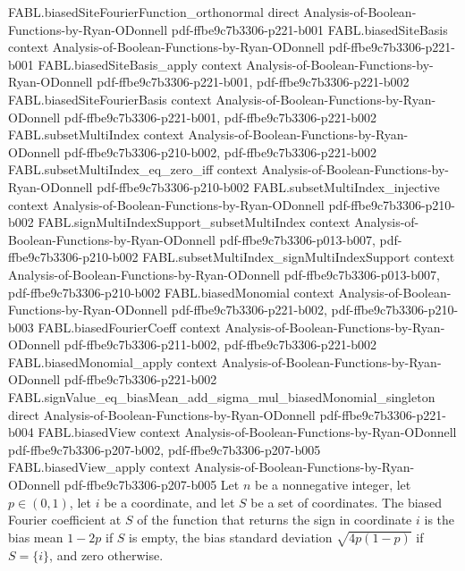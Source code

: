 \begin{theorem}
  {FABL.biasedSiteFourierFunction_orthonormal}
  {direct}
  {Analysis-of-Boolean-Functions-by-Ryan-ODonnell}
  {pdf-ffbe9c7b3306-p221-b001}
\proofstep
  {FABL.biasedSiteBasis}
  {context}
  {Analysis-of-Boolean-Functions-by-Ryan-ODonnell}
  {pdf-ffbe9c7b3306-p221-b001}
\proofstep
  {FABL.biasedSiteBasis_apply}
  {context}
  {Analysis-of-Boolean-Functions-by-Ryan-ODonnell}
  {pdf-ffbe9c7b3306-p221-b001,
    pdf-ffbe9c7b3306-p221-b002}
\proofstep
  {FABL.biasedSiteFourierBasis}
  {context}
  {Analysis-of-Boolean-Functions-by-Ryan-ODonnell}
  {pdf-ffbe9c7b3306-p221-b001,
    pdf-ffbe9c7b3306-p221-b002}
\proofstep
  {FABL.subsetMultiIndex}
  {context}
  {Analysis-of-Boolean-Functions-by-Ryan-ODonnell}
  {pdf-ffbe9c7b3306-p210-b002,
    pdf-ffbe9c7b3306-p221-b002}
\proofstep
  {FABL.subsetMultiIndex_eq_zero_iff}
  {context}
  {Analysis-of-Boolean-Functions-by-Ryan-ODonnell}
  {pdf-ffbe9c7b3306-p210-b002}
\proofstep
  {FABL.subsetMultiIndex_injective}
  {context}
  {Analysis-of-Boolean-Functions-by-Ryan-ODonnell}
  {pdf-ffbe9c7b3306-p210-b002}
\proofstep
  {FABL.signMultiIndexSupport_subsetMultiIndex}
  {context}
  {Analysis-of-Boolean-Functions-by-Ryan-ODonnell}
  {pdf-ffbe9c7b3306-p013-b007,
    pdf-ffbe9c7b3306-p210-b002}
\proofstep
  {FABL.subsetMultiIndex_signMultiIndexSupport}
  {context}
  {Analysis-of-Boolean-Functions-by-Ryan-ODonnell}
  {pdf-ffbe9c7b3306-p013-b007,
    pdf-ffbe9c7b3306-p210-b002}
\proofstep
  {FABL.biasedMonomial}
  {context}
  {Analysis-of-Boolean-Functions-by-Ryan-ODonnell}
  {pdf-ffbe9c7b3306-p221-b002,
    pdf-ffbe9c7b3306-p210-b003}
\proofstep
  {FABL.biasedFourierCoeff}
  {context}
  {Analysis-of-Boolean-Functions-by-Ryan-ODonnell}
  {pdf-ffbe9c7b3306-p211-b002,
    pdf-ffbe9c7b3306-p221-b002}
\proofstep
  {FABL.biasedMonomial_apply}
  {context}
  {Analysis-of-Boolean-Functions-by-Ryan-ODonnell}
  {pdf-ffbe9c7b3306-p221-b002}
\proofstep
  {FABL.signValue_eq_biasMean_add_sigma_mul_biasedMonomial_singleton}
  {direct}
  {Analysis-of-Boolean-Functions-by-Ryan-ODonnell}
  {pdf-ffbe9c7b3306-p221-b004}
\proofstep
  {FABL.biasedView}
  {context}
  {Analysis-of-Boolean-Functions-by-Ryan-ODonnell}
  {pdf-ffbe9c7b3306-p207-b002,
    pdf-ffbe9c7b3306-p207-b005}
\proofstep
  {FABL.biasedView_apply}
  {context}
  {Analysis-of-Boolean-Functions-by-Ryan-ODonnell}
  {pdf-ffbe9c7b3306-p207-b005}
Let $n$ be a nonnegative integer, let $p\in(0,1)$, let $i$ be a coordinate, and let $S$
be a set of coordinates. The biased Fourier coefficient at $S$ of the function that
returns the sign in coordinate $i$ is the bias mean $1-2p$ if $S$ is empty, the bias
standard deviation $\sqrt{4p(1-p)}$ if $S=\{i\}$, and zero otherwise.
\end{theorem}

